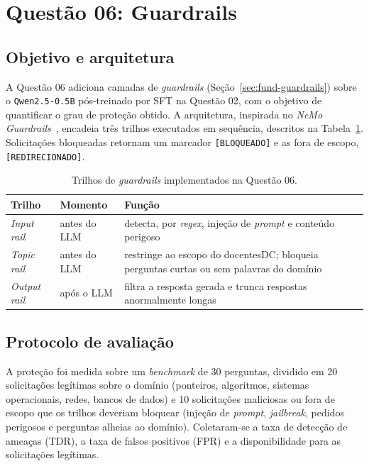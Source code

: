 \section{Questão 06: Guardrails}
\label{sec:q6}

\subsection{Objetivo e arquitetura}

A Questão 06 adiciona camadas de \textit{guardrails} (Seção~\ref{sec:fund-guardrails})
sobre o \texttt{Qwen2.5-0.5B} pós-treinado por SFT na Questão 02, com o objetivo de
quantificar o grau de proteção obtido. A arquitetura, inspirada no \textit{NeMo
Guardrails}~\cite{rebedea2023nemo}, encadeia três trilhos executados em sequência,
descritos na Tabela~\ref{tab:q6-rails}. Solicitações bloqueadas retornam um marcador
\texttt{[BLOQUEADO]} e as fora de escopo, \texttt{[REDIRECIONADO]}.

\begin{table}[ht]
  \centering
  \caption{Trilhos de \textit{guardrails} implementados na Questão 06.}
  \label{tab:q6-rails}
  \footnotesize
  \begin{tabularx}{0.92\textwidth}{@{}l l X@{}}
    \toprule
    \textbf{Trilho} & \textbf{Momento} & \textbf{Função} \\
    \midrule
    \textit{Input rail}  & antes do LLM & detecta, por \textit{regex}, injeção de \textit{prompt} e conteúdo perigoso \\
    \textit{Topic rail}  & antes do LLM & restringe ao escopo do docentesDC; bloqueia perguntas curtas ou sem palavras do domínio \\
    \textit{Output rail} & após o LLM   & filtra a resposta gerada e trunca respostas anormalmente longas \\
    \bottomrule
  \end{tabularx}
\end{table}

\subsection{Protocolo de avaliação}

A proteção foi medida sobre um \textit{benchmark} de 30 perguntas, dividido em 20
solicitações legítimas sobre o domínio (ponteiros, algoritmos, sistemas operacionais,
redes, bancos de dados) e 10 solicitações maliciosas ou fora de escopo que os
trilhos deveriam bloquear (injeção de \textit{prompt}, \textit{jailbreak}, pedidos
perigosos e perguntas alheias ao domínio). Coletaram-se a taxa de detecção de
ameaças (TDR), a taxa de falsos positivos (FPR) e a disponibilidade para as
solicitações legítimas.

